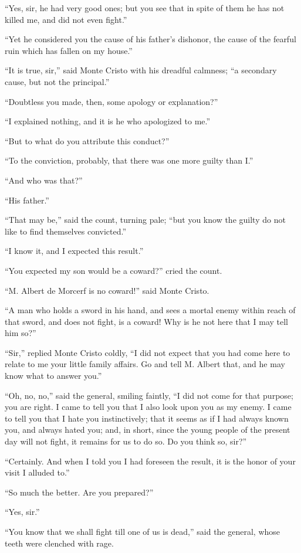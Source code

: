 “Yes, sir, he had very good ones; but you see that in spite of them he
has not killed me, and did not even fight.”

“Yet he considered you the cause of his father’s dishonor, the cause of
the fearful ruin which has fallen on my house.”

“It is true, sir,” said Monte Cristo with his dreadful calmness; “a
secondary cause, but not the principal.”

“Doubtless you made, then, some apology or explanation?”

“I explained nothing, and it is he who apologized to me.”

“But to what do you attribute this conduct?”

“To the conviction, probably, that there was one more guilty than I.”

“And who was that?”

“His father.”

“That may be,” said the count, turning pale; “but you know the guilty
do not like to find themselves convicted.”

“I know it, and I expected this result.”

“You expected my son would be a coward?” cried the count.

“M. Albert de Morcerf is no coward!” said Monte Cristo.

“A man who holds a sword in his hand, and sees a mortal enemy within
reach of that sword, and does not fight, is a coward! Why is he not
here that I may tell him so?”

“Sir,” replied Monte Cristo coldly, “I did not expect that you had come
here to relate to me your little family affairs. Go and tell M. Albert
that, and he may know what to answer you.”

“Oh, no, no,” said the general, smiling faintly, “I did not come for
that purpose; you are right. I came to tell you that I also look upon
you as my enemy. I came to tell you that I hate you instinctively; that
it seems as if I had always known you, and always hated you; and, in
short, since the young people of the present day will not fight, it
remains for us to do so. Do you think so, sir?”

“Certainly. And when I told you I had foreseen the result, it is the
honor of your visit I alluded to.”

“So much the better. Are you prepared?”

“Yes, sir.”

“You know that we shall fight till one of us is dead,” said the
general, whose teeth were clenched with rage.


